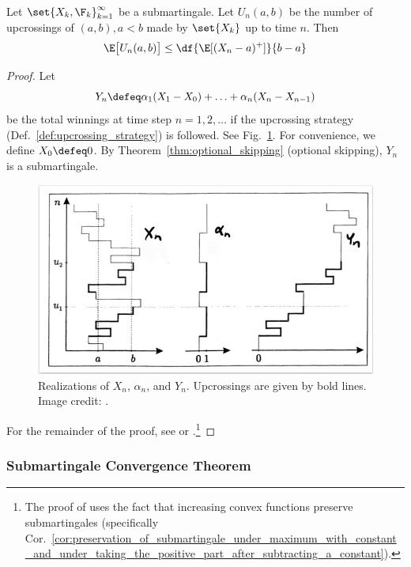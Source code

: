 \documentclass{article} %
\begin{document}
\begin{theorem}
Let $\set{X_k, \F_k}_{k=1}^\infty$ be a submartingale.  Let $U_n(a,b)$ be the number of upcrossings of $(a,b), a<b$ made by $\set{X_k}$ up to time $n$.   Then
\[ \E \big[U_n(a,b) \big] \leq \df{\E[(X_n - a)^+]}{b-a} \]	
\label{thm:upcrossing}
\end{theorem}

\begin{proof}
Let
\[ Y_n \defeq \alpha_1 (X_1 - X_0) + \hdots + \alpha_n (X_n - X_{n-1})\]
be the total winnings at time step $n=1,2,\hdots$ if the upcrossing strategy (Def.~\ref{def:upcrossing_strategy}) is followed. See Fig.~\ref{fig:upcrossing_strategy_per_yellow_book}. For convenience, we define $X_0 \defeq 0$. By Theorem~\ref{thm:optional_skipping} (optional skipping), $Y_n$ is a submartingale.   
 
\begin{figure}[H]
\centering
\includegraphics[width=.7\textwidth]{images/upcrossing_theorem_per_yellow_book.png}
\caption{Realizations of $X_n$, $\alpha_n$, and $Y_n$. Upcrossings are given by bold lines.  Image credit: \cite[pp.71]      {brzezniak2000basic}.}
\label{fig:upcrossing_strategy_per_yellow_book}
\end{figure}


For the remainder of the proof, see \cite[pp.258]{ash2000probability} or \cite[pp.70]{brzezniak2000basic}.\footnote{The proof of \citet{ash2000probability} uses the fact that increasing convex functions preserve submartingales (specifically Cor.~\ref{cor:preservation_of_submartingale_under_maximum_with_constant_and_under_taking_the_positive_part_after_subtracting_a_constant}).}
\end{proof}



\subsubsection{Submartingale Convergence Theorem}
\end{document}
